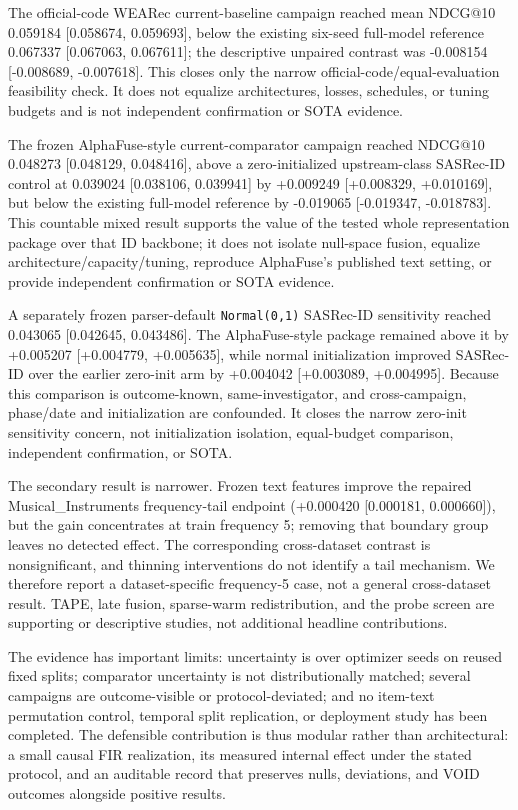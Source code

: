 The official-code WEARec current-baseline campaign reached mean NDCG@10 0.059184
[0.058674, 0.059693], below the existing six-seed full-model reference 0.067337
[0.067063, 0.067611]; the descriptive unpaired contrast was -0.008154
[-0.008689, -0.007618]. This closes only the narrow official-code/equal-evaluation
feasibility check. It does not equalize architectures, losses, schedules, or tuning
budgets and is not independent confirmation or SOTA evidence.

The frozen AlphaFuse-style current-comparator campaign reached NDCG@10 0.048273
[0.048129, 0.048416], above a zero-initialized upstream-class SASRec-ID control at 0.039024
[0.038106, 0.039941] by +0.009249 [+0.008329, +0.010169], but below the existing
full-model reference by -0.019065 [-0.019347, -0.018783]. This countable mixed result
supports the value of the tested whole representation package over that ID backbone;
it does not isolate null-space fusion, equalize architecture/capacity/tuning, reproduce
AlphaFuse's published text setting, or provide independent confirmation or SOTA evidence.

A separately frozen parser-default \texttt{Normal(0,1)} SASRec-ID sensitivity reached
0.043065 [0.042645, 0.043486]. The AlphaFuse-style package remained above it by
+0.005207 [+0.004779, +0.005635], while normal initialization improved SASRec-ID over
the earlier zero-init arm by +0.004042 [+0.003089, +0.004995]. Because this comparison
is outcome-known, same-investigator, and cross-campaign, phase/date and initialization
are confounded. It closes the narrow zero-init sensitivity concern, not initialization
isolation, equal-budget comparison, independent confirmation, or SOTA.

The secondary result is narrower. Frozen text features improve the repaired
Musical\_Instruments frequency-tail endpoint (+0.000420 [0.000181, 0.000660]),
but the gain concentrates at train frequency 5; removing that boundary group leaves no
detected effect. The corresponding cross-dataset contrast is nonsignificant, and
thinning interventions do not identify a tail mechanism. We therefore report a
dataset-specific frequency-5 case, not a general cross-dataset result. TAPE, late fusion,
sparse-warm redistribution, and the probe screen are supporting or descriptive studies,
not additional headline contributions.

The evidence has important limits: uncertainty is over optimizer seeds on reused fixed
splits; comparator uncertainty is not distributionally matched; several campaigns are
outcome-visible or protocol-deviated; and no item-text permutation control, temporal
split replication, or deployment study has been completed. The defensible contribution
is thus modular rather than architectural: a small causal FIR realization, its measured
internal effect under the stated protocol, and an auditable record that preserves nulls,
deviations, and VOID outcomes alongside positive results.


